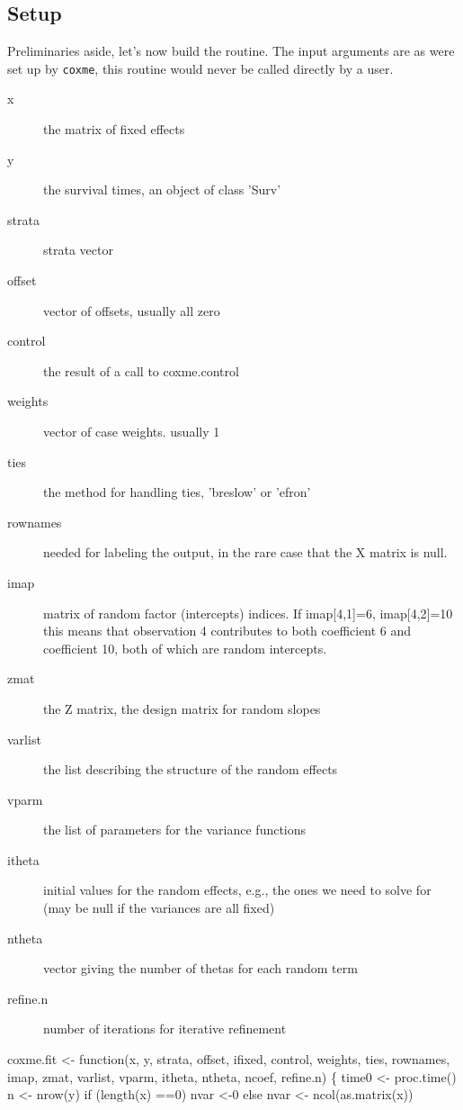 \documentclass{article}
\begin{document}
\subsection{Setup}
Preliminaries aside, let's now build the routine.               %
The input arguments are as were set up by {\tt{}coxme}, this
routine would never be called directly by a user.
\begin{description}
  \item[x] the matrix of fixed effects
  \item[y] the survival times, an object of class 'Surv'
  \item[strata] strata vector
  \item[offset] vector of offsets, usually all zero
  \item[control] the result of a call to coxme.control
  \item[weights] vector of case weights. usually 1
  \item[ties] the method for handling ties, 'breslow' or 'efron'
  \item[rownames] needed for labeling the output, in the rare case that
    the X matrix is null.
  \item[imap] matrix of random factor (intercepts) indices.  If imap[4,1]=6,
    imap[4,2]=10 this means that observation 4 contributes to both coefficient
    6 and coefficient 10, both of which are random intercepts.
  \item[zmat] the Z matrix, the design matrix for random slopes
  \item[varlist] the list describing the structure of the random effects
  \item[vparm] the list of parameters for the variance functions
  \item[itheta] initial values for the random effects, e.g., the ones we need
    to solve for  (may be null if the variances are all fixed)
  \item[ntheta] vector giving the number of thetas for each random term
  \item[refine.n] number of iterations for iterative refinement
\end{description}
\nwenddocs{}\endmoddef
coxme.fit <- function(x, y, strata, offset, ifixed, control,
                        weights, ties, rownames, 
                        imap, zmat, varlist, vparm, itheta,
                        ntheta, ncoef, refine.n) \{
    time0 <- proc.time()
    n <-  nrow(y)
    if (length(x) ==0) nvar <-0
    else nvar <- ncol(as.matrix(x))
    
\end{document}
